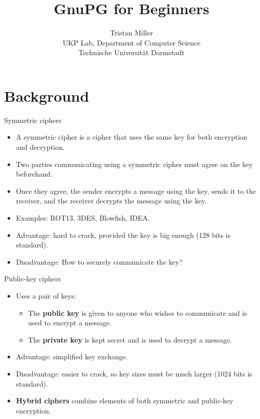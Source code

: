 \documentclass[%
mode=present,%
paper=screen%
]{powerdot}
\title{GnuPG for Beginners}
\author{%
  Tristan Miller\\
  UKP Lab, Department of Computer Science\\
  Technische Universit\"at Darmstadt
}
\begin{document}
\maketitle

\section{Background}
\begin{slide}{Symmetric ciphers}
  \begin{itemize}
  \item A symmetric cipher is a cipher that uses the same key for both
    encryption and decryption.
  \item Two parties communicating using a symmetric cipher must agree
    on the key beforehand.
  \item Once they agree, the sender encrypts a message using the key,
    sends it to the receiver, and the receiver decrypts the message
    using the key.
  \item Examples: ROT13, 3DES, Blowfish, IDEA.
  \item Advantage: hard to crack, provided the key is big enough (128 bits is
    standard).
  \item Disadvantage: How to securely communicate the key?
  \end{itemize}
\end{slide}

\begin{slide}{Public-key ciphers}
  \begin{itemize}
  \item Uses a pair of keys:
    \begin{itemize}
    \item The \textbf{public key} is given to anyone who wishes to
      communicate and is used to encrypt a message.
    \item The \textbf{private key} is kept secret and is used to
      decrypt a message.
    \end{itemize}
  \item Advantage: simplified key exchange.
  \item Disadvantage: easier to crack, so key sizes must be much
    larger (1024 bits is standard).
  \item \textbf{Hybrid ciphers} combine elements of both symmetric
    and public-key encryption.
  \end{itemize}
\end{slide}
\end{document}
